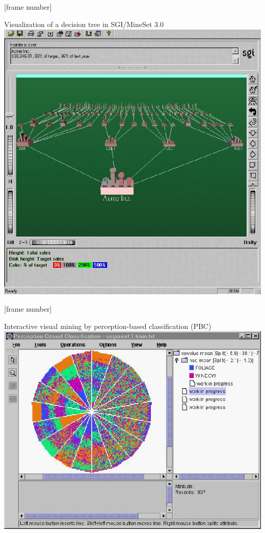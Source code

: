\documentclass[aspectratio=169,t,table]{beamer}
\begin{document}
  {
    [frame number]
    \begin{frame}{Visualization of a decision tree in SGI/MineSet 3.0}
      \centering
      \includegraphics[height=0.9\textheight]{img/classification2.jpeg}
    \end{frame}
  }

  {
    [frame number]
    \begin{frame}{Interactive visual mining by perception-based classification (PBC)}
      \centering
      \includegraphics[height=0.9\textheight]{img/classification3.jpeg}
    \end{frame}
  }
\end{document}
